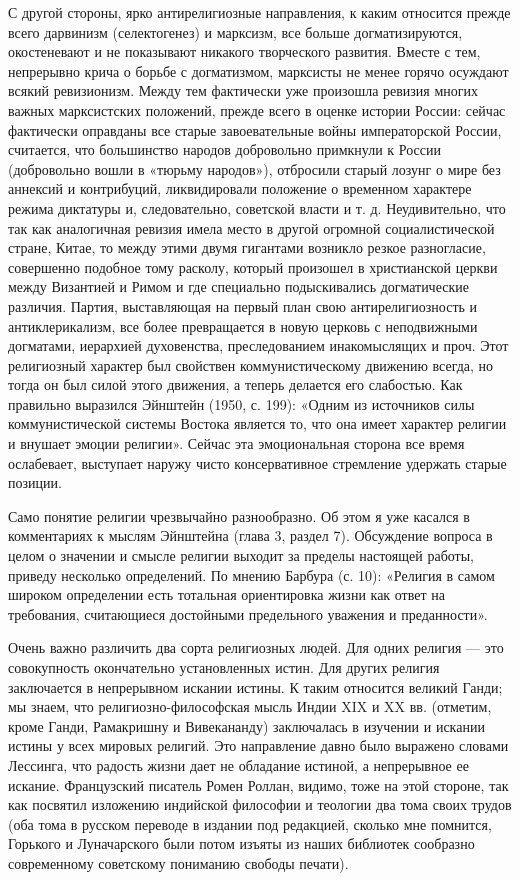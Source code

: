 С другой стороны, ярко  антирелигиозные направления, к каким относится
прежде  всего   дарвинизм  (селектогенез)   и  марксизм,   все  больше
догматизируются,  окостеневают и  не  показывают никакого  творческого
развития.  Вместе с  тем,  непрерывно крича  о  борьбе с  догматизмом,
марксисты  не  менее горячо  осуждают  всякий  ревизионизм. Между  тем
фактически уже произошла ревизия многих важных марксистских положений,
прежде всего в оценке истории  России: сейчас фактически оправданы все
старые  завоевательные  войны  императорской  России,  считается,  что
большинство народов добровольно примкнули  к России (добровольно вошли
в «тюрьму  народов»), отбросили  старый лозунг о  мире без  аннексий и
контрибуций,  ликвидировали  положение  о временном  характере  режима
диктатуры и,  следовательно, советской  власти и т.  д. Неудивительно,
что  так  как  аналогичная  ревизия  имела  место  в  другой  огромной
социалистической  стране,  Китае,  то   между  этими  двумя  гигантами
возникло резкое разногласие, совершенно подобное тому расколу, который
произошел  в  христианской  церкви  между  Византией  и  Римом  и  где
специально подыскивались догматические  различия. Партия, выставляющая
на  первый план  свою антирелигиозность  и антиклерикализм,  все более
превращается  в  новую  церковь с  неподвижными  догматами,  иерархией
духовенства,  преследованием инакомыслящих  и  проч. Этот  религиозный
характер был свойствен коммунистическому  движению всегда, но тогда он
был  силой  этого  движения,  а теперь  делается  его  слабостью.  Как
правильно выразился Эйнштейн (1950, с. 199): «Одним из источников силы
коммунистической системы  Востока является то, что  она имеет характер
религии и  внушает эмоции  религии». Сейчас эта  эмоциональная сторона
все время ослабевает, выступает наружу чисто консервативное стремление
удержать старые позиции.

Само понятие религии чрезвычайно разнообразно. Об этом я уже касался в
комментариях  к  мыслям  Эйнштейна  (глава 3,  раздел  7).  Обсуждение
вопроса  в  целом о  значении  и  смысле  религии выходит  за  пределы
настоящей работы, приведу несколько определений. По мнению Барбура (с.
10): «Религия в самом  широком определении есть тотальная ориентировка
жизни  как ответ  на  требования,  считающиеся достойными  предельного
уважения и преданности».

Очень важно различить  два сорта религиозных людей.  Для одних религия
---  это совокупность  окончательно  установленных  истин. Для  других
религия заключается  в непрерывном  искании истины. К  таким относится
великий Ганди; мы знаем, что  религиозно-философская мысль Индии XIX и
XX вв. (отметим, кроме Ганди,  Рамакришну и Вивекананду) заключалась в
изучении  и искании  истины у  всех мировых  религий. Это  направление
давно  было  выражено словами  Лессинга,  что  радость жизни  дает  не
обладание  истиной, а  непрерывное  ее  искание. Французский  писатель
Ромен Роллан, видимо, тоже на этой стороне, так как посвятил изложению
индийской  философии и  теологии два  тома  своих трудов  (оба тома  в
русском  переводе  в  издании  под редакцией,  сколько  мне  помнится,
Горького и Луначарского были потом изъяты из наших библиотек сообразно
современному советскому пониманию свободы печати).

